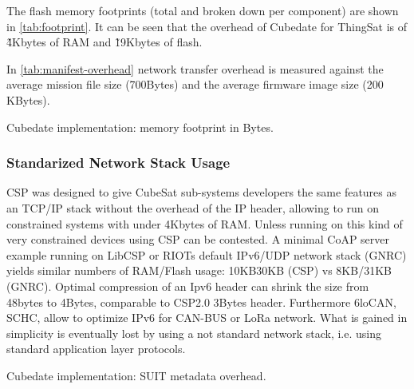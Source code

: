 The flash memory footprints (total and broken down per component) are shown in
\autoref{tab:footprint}. It can be seen that the overhead of Cubedate for ThingSat
is of \~4Kbytes of RAM and \~19Kbytes of flash.

In \autoref{tab:manifest-overhead} network transfer overhead is measured against the average mission file size (700Bytes) and the average firmware image size (200 KBytes).

\begin{table}[ht]
\begin{adjustbox}{width=0.8\columnwidth,center}
    \centering
        
\end{adjustbox}
\caption{Cubedate implementation: memory footprint in Bytes.}
\label{tab:footprint}
\end{table}

\subsubsection{Standarized Network Stack Usage}

CSP was designed to give CubeSat sub-systems developers the same features as an
TCP/IP stack without the overhead of the IP header, allowing to run on constrained
systems with under 4Kbytes of RAM. Unless running on this kind of very constrained
devices using CSP can be contested. A minimal CoAP server example running on
LibCSP or RIOTs default IPv6/UDP network stack (GNRC) yields similar numbers of RAM/Flash
usage: 10KB\/30KB (CSP) vs 8KB/31KB (GNRC). Optimal compression of an Ipv6 header
can shrink the size from 48bytes to 4Bytes, comparable to CSP2.0 3Bytes header.
Furthermore  6loCAN\cite{wachter20206locan01}, SCHC\cite{rfc8724}, allow to
optimize IPv6 for CAN-BUS or LoRa network. What is gained in simplicity is eventually
lost by using a not standard network stack, i.e. using standard application
layer protocols.

\begin{table}[ht]

\begin{adjustbox}{width=0.5\columnwidth,center}
    \centering
    
\end{adjustbox}
\caption{Cubedate implementation: SUIT metadata overhead.}
\label{tab:manifest-overhead}
\end{table}

